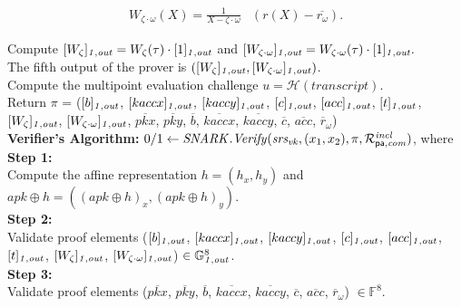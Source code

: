 \begin{align*}
W_{\zeta \cdot \omega}(X) = \frac{1}{X-\zeta \cdot \omega}&(r(X) - \overline{r_{\omega}}).
\end{align*}

\noindent Compute $[W_{\zeta}]_{\mathit{1,out}} = W_{\zeta}(\tau) \cdot [1]_{\mathit{1,out}}$ and $[W_{\zeta \cdot \omega}]_{\mathit{1,out}} = W_{\zeta \cdot \omega}(\tau) \cdot [1]_{\mathit{1,out}}.$ \\

\noindent The fifth output of the prover is $([W_{\zeta}]_{\mathit{1,out}}, [W_{\zeta \cdot \omega}]_{\mathit{1,out}})$. \\

\noindent Compute the multipoint evaluation challenge $u = \mathcal{H}(transcript)$. \\

\noindent Return $\pi$ = ($[b]_{\mathit{1,out}}$, $[kaccx]_{\mathit{1,out}}$, $[kaccy]_{\mathit{1,out}}$, $[c]_{\mathit{1,out}}$, $[acc]_{\mathit{1,out}}$, $[t]_{\mathit{1,out}}$, $[W_{\zeta}]_{\mathit{1,out}}$, 
$[W_{\zeta \cdot \omega}]_{\mathit{1,out}}$,  $\overline{pkx}$, $\overline{pky}$, $\overline{b}$, $\overline{kaccx}$, $\overline{kaccy}$, $\overline{c}$, 
$\overline{acc}$, $\overline{r}_{\omega}$) \\  

\noindent \textbf{Verifier's Algorithm:} $0/1 \leftarrow \mathit{SNARK.Verify}(\mathit{srs_{vk}}, (x_1, x_2), \pi, \mathcal{R}^{\mathit{incl}}_{\mathsf{pa},\mathit{com}})$, where\\ 

\noindent \textbf{Step 1:} \\
\noindent Compute the affine representation $h = (h_x, h_y)$ and  $apk \oplus h = ((apk \oplus h)_{x}, (apk \oplus h)_{y})$.\\

\noindent \textbf{Step 2:} \\
\noindent Validate proof elements ($[b]_{\mathit{1,out}}$, $[kaccx]_{\mathit{1,out}}$, $[kaccy]_{\mathit{1,out}}$, $[c]_{\mathit{1,out}}$, $[acc]_{\mathit{1,out}}$, $[t]_{\mathit{1,out}}$, 
$[W_{\zeta}]_{\mathit{1,out}}$, $[W_{\zeta \cdot \omega}]_{\mathit{1,out}}$) $ \in \mathbb{G}_{\mathit{1,out}}^{8}$. \\ 

\noindent \textbf{Step 3:} \\
\noindent Validate proof elements ($\overline{pkx}$, $\overline{pky}$, $\overline{b}$, $\overline{kaccx}$, 
$\overline{kaccy}$, $\overline{c}$, $\overline{acc}$, $\overline{r}_{\omega}$) $\in \mathbb{F}^{8}$. \\

